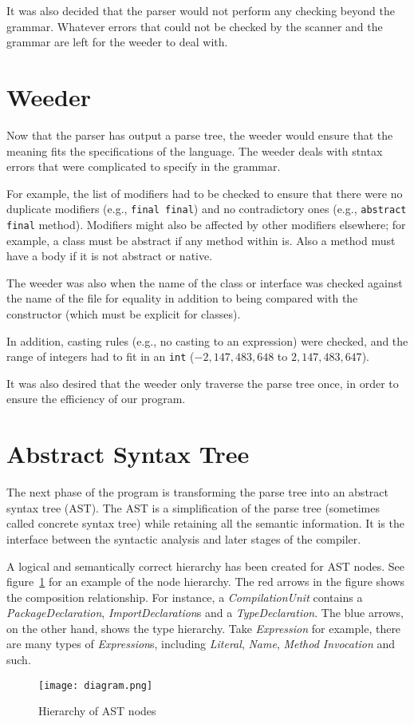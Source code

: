 It was also decided that the parser would not perform any checking beyond the grammar. Whatever errors that could not be checked by the scanner and the grammar are left for the weeder to deal with.

\section{Weeder}
\label{weeder_design}

Now that the parser has output a parse tree, the weeder would ensure that the meaning fits the specifications of the language. The weeder deals with stntax errors that were complicated to specify in the grammar.

For example, the list of modifiers had to be checked to ensure that there were no duplicate modifiers (e.g., \verb|final final|)
  and no contradictory ones (e.g., \verb|abstract final| method).
Modifiers might also be affected by other modifiers elsewhere; for example, a class must be abstract if any method within is. Also a method must have a body if it is not abstract or native.

The weeder was also when the name of the class or interface was checked against the name of the file for equality
  in addition to being compared with the constructor (which must be explicit for classes).

In addition, casting rules (e.g., no casting to an expression) were checked,
  and the range of integers had to fit in an \verb|int| ($- 2,147,483,648$ to $2,147,483,647$).

It was also desired that the weeder only traverse the parse tree once, in order to ensure the efficiency of our program.

\section{Abstract Syntax Tree}
The next phase of the program is transforming the parse tree into an abstract syntax tree (AST). The AST is a simplification of the parse tree (sometimes called concrete syntax tree) while retaining all the semantic information. It is the interface between the syntactic analysis and later stages of the compiler. 

A logical and semantically correct hierarchy has been created for AST nodes. See figure~\ref{ast} for an example of the node hierarchy. The red arrows in the figure shows the composition relationship.  For instance, a \emph{CompilationUnit} contains a \emph{PackageDeclaration}, \emph{ImportDeclaration}s and a \emph{TypeDeclaration}. The blue arrows, on the other hand, shows the type hierarchy. Take \emph{Expression} for example, there are many types of \emph{Expression}s, including \emph{Literal}, \emph{Name}, \emph{Method Invocation} and such.
\begin{center}
\begin{figure}

\texttt{[image: diagram.png]}

\caption{Hierarchy of AST nodes}
\label{ast}
\end{figure}
\end{center}